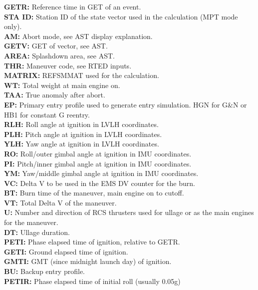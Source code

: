 \documentclass[11pt]{article} %
\begin{document}
\textbf{GETR:} Reference time in GET of an event.\\
\textbf{STA ID:} Station ID of the state vector used in the calculation (MPT mode only).\\
\textbf{AM:} Abort mode, see AST display explanation.\\
\textbf{GETV:} GET of vector, see AST.\\
\textbf{AREA:} Splashdown area, see AST.\\
\textbf{THR:} Maneuver code, see RTED inputs.\\
\textbf{MATRIX:} REFSMMAT used for the calculation.\\
\textbf{WT:} Total weight at main engine on.\\
\textbf{TAA:} True anomaly after abort.\\
\textbf{EP:} Primary entry profile used to generate entry simulation. HGN for G\&N or HB1 for constant G reentry.\\
\textbf{RLH:} Roll angle at ignition in LVLH coordinates.\\ 
\textbf{PLH:} Pitch angle at ignition in LVLH coordinates.\\ 
\textbf{YLH:} Yaw angle at ignition in LVLH coordinates.\\ 
\textbf{RO:} Roll/outer gimbal angle at ignition in IMU coordinates.\\
\textbf{PI:} Pitch/inner gimbal angle at ignition in IMU coordinates.\\
\textbf{YM:} Yaw/middle gimbal angle at ignition in IMU coordinates.\\
\textbf{VC:} Delta V to be used in the EMS DV counter for the burn.\\
\textbf{BT:} Burn time of the maneuver, main engine on to cutoff.\\
\textbf{VT:} Total Delta V of the maneuver.\\
\textbf{U:} Number and direction of RCS thrusters used for ullage or as the main engines for the maneuver.\\
\textbf{DT:} Ullage duration.\\
\textbf{PETI:} Phase elapsed time of ignition, relative to GETR.\\
\textbf{GETI:} Ground elapsed time of ignition.\\
\textbf{GMTI:} GMT (since midnight launch day) of ignition.\\
\textbf{BU:} Backup entry profile.\\
\textbf{PETIR:} Phase elapsed time of initial roll (usually 0.05g)\\
\end{document}
